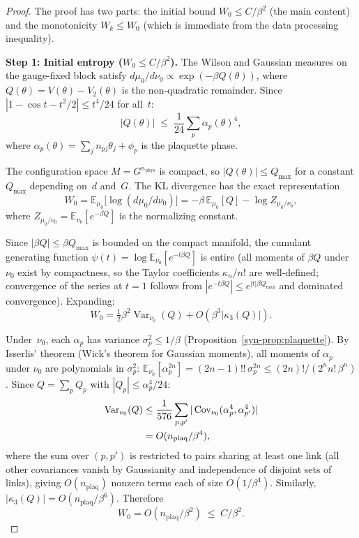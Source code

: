 \documentclass[11pt]{article}
\theoremstyle{definition}
\newcommand{\E}{\mathbb{E}}
\newcommand{\Var}{\operatorname{Var}}
\newcommand{\Cov}{\operatorname{Cov}}
\begin{document}
\begin{proof}
The proof has two parts: the initial bound $W_0 \leq
C/\beta^2$ (the main content) and the monotonicity
$W_k \leq W_0$ (which is immediate from the data
processing inequality).

\smallskip
\noindent\textbf{Step 1: Initial entropy
($W_0 \leq C/\beta^2$).}
The Wilson and Gaussian measures on the gauge-fixed
block satisfy
$d\mu_0/d\nu_0 \propto \exp(-\beta Q(\theta))$,
where $Q(\theta) = V(\theta) - V_2(\theta)$ is the
non-quadratic remainder.  Since
$|1 - \cos t - t^2/2| \leq t^4/24$ for all~$t$:
\begin{equation}\label{syn-eq:Q_bound}
  |Q(\theta)| \;\leq\; \frac{1}{24}\sum_p
  \alpha_p(\theta)^4,
\end{equation}
where $\alpha_p(\theta) = \sum_j n_{pj}\theta_j
+ \phi_p$ is the plaquette phase.

The configuration space $M = G^{n_{\mathrm{phys}}}$
is compact, so $|Q(\theta)| \leq Q_{\max}$ for a
constant $Q_{\max}$ depending on~$d$ and~$G$.
The KL divergence has the exact representation
\begin{equation}\label{syn-eq:W0_exact}
  W_0 = \E_{\mu_0}\bigl[\log(d\mu_0/d\nu_0)\bigr]
  = -\beta\,\E_{\mu_0}[Q]
  - \log Z_{\mu_0/\nu_0},
\end{equation}
where $Z_{\mu_0/\nu_0} = \E_{\nu_0}[e^{-\beta Q}]$
is the normalizing constant.

Since $|\beta Q| \leq \beta Q_{\max}$ is bounded on the
compact manifold, the cumulant generating function
$\psi(t) = \log\E_{\nu_0}[e^{-t\beta Q}]$
is entire (all moments of $\beta Q$ under $\nu_0$ exist
by compactness, so the Taylor coefficients
$\kappa_n/n!$ are well-defined; convergence of the
series at $t = 1$ follows from
$|e^{-t\beta Q}| \leq e^{|t|\beta Q_{\max}}$ and
dominated convergence).
Expanding:
\begin{equation}
  W_0 = \tfrac{1}{2}\beta^2\Var_{\nu_0}(Q)
  + O(\beta^3|\kappa_3(Q)|).
\end{equation}

Under~$\nu_0$, each $\alpha_p$ has variance
$\sigma_p^2 \leq 1/\beta$
(Proposition~\ref{syn-prop:plaquette}).
By Isserlis' theorem (Wick's theorem for Gaussian
moments), all moments of $\alpha_p$ under $\nu_0$
are polynomials in $\sigma_p^2$:
$\E_{\nu_0}[\alpha_p^{2n}]
= (2n{-}1)!!\,\sigma_p^{2n} \leq
(2n)!/(2^n n!\,\beta^n)$.
Since $Q = \sum_p Q_p$ with $|Q_p| \leq
\alpha_p^4/24$:
\begin{align}
  \Var_{\nu_0}(Q) &\leq
  \frac{1}{576}\sum_{p,p'}
  |\Cov_{\nu_0}(\alpha_p^4, \alpha_{p'}^4)|
  \notag\\
  &= O(n_{\mathrm{plaq}}/\beta^4),
  \label{syn-eq:varQ}
\end{align}
where the sum over $(p, p')$ is restricted to pairs
sharing at least one link (all other covariances
vanish by Gaussianity and independence of disjoint
sets of links), giving $O(n_{\mathrm{plaq}})$ nonzero
terms each of size $O(1/\beta^4)$.
Similarly, $|\kappa_3(Q)| = O(n_{\mathrm{plaq}}/\beta^6)$.
Therefore
\begin{equation}\label{syn-eq:W0}
  W_0 = O(n_{\mathrm{plaq}}/\beta^2)
  \;\leq\; C/\beta^2.
\end{equation}


\end{proof}
\end{document}
